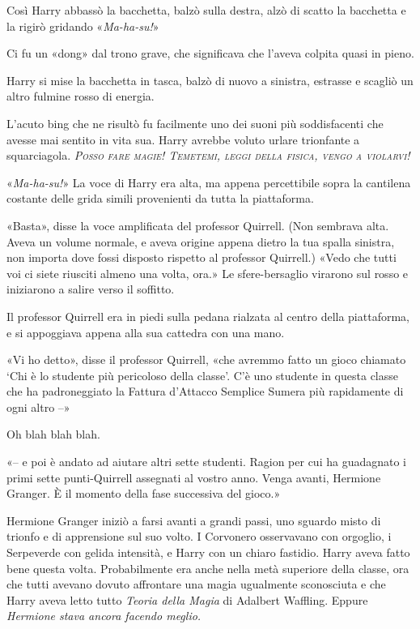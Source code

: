 Così Harry abbassò la bacchetta, balzò sulla destra, alzò di scatto la bacchetta e la rigirò gridando «\textit{Ma-ha-su!}»

Ci fu un «dong» dal trono grave, che significava che l’aveva colpita quasi in pieno.

Harry si mise la bacchetta in tasca, balzò di nuovo a sinistra, estrasse e scagliò un altro fulmine rosso di energia.

L’acuto bing che ne risultò fu facilmente uno dei suoni più soddisfacenti che avesse mai sentito in vita sua. Harry avrebbe voluto urlare trionfante a squarciagola. \textsl{\textsc{Posso fare magie! Temetemi, leggi della fisica, vengo a violarvi!}}

«\textit{Ma-ha-su!}» La voce di Harry era alta, ma appena percettibile sopra la cantilena costante delle grida simili provenienti da tutta la piattaforma.

«Basta», disse la voce amplificata del professor Quirrell. (Non sembrava alta. Aveva un volume normale, e aveva origine appena dietro la tua spalla sinistra, non importa dove fossi disposto rispetto al professor Quirrell.) «Vedo che tutti voi ci siete riusciti almeno una volta, ora.» Le sfere-bersaglio virarono sul rosso e iniziarono a salire verso il soffitto.

Il professor Quirrell era in piedi sulla pedana rialzata al centro della piattaforma, e si appoggiava appena alla sua cattedra con una mano.

«Vi ho detto», disse il professor Quirrell, «che avremmo fatto un gioco chiamato ‘Chi è lo studente più pericoloso della classe’. C’è uno studente in questa classe che ha padroneggiato la Fattura d’Attacco Semplice Sumera più rapidamente di ogni altro –»

Oh blah blah blah.

«– e poi è andato ad aiutare altri sette studenti. Ragion per cui ha guadagnato i primi sette punti-Quirrell assegnati al vostro anno. Venga avanti, Hermione Granger. È il momento della fase successiva del gioco.»

Hermione Granger iniziò a farsi avanti a grandi passi, uno sguardo misto di trionfo e di apprensione sul suo volto. I Corvonero osservavano con orgoglio, i Serpeverde con gelida intensità, e Harry con un chiaro fastidio. Harry aveva fatto bene questa volta. Probabilmente era anche nella metà superiore della classe, ora che tutti avevano dovuto affrontare una magia ugualmente sconosciuta e che Harry aveva letto tutto \textit{Teoria della Magia} di Adalbert Waffling. Eppure \textit{Hermione stava ancora facendo meglio.}

